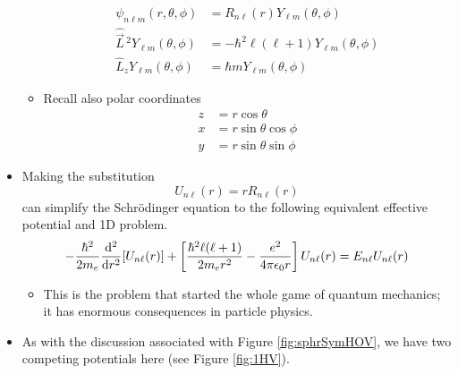 \documentclass[../notes.tex]{subfiles}
\begin{document}
\begin{itemize}
\begin{itemize}
        \begin{align*}
            \psi_{n\ell m}(r,\theta,\phi) &= R_{n\ell}(r)Y_{\ell m}(\theta,\phi)\\
            \hat{\vec{L}}{\,}^2Y_{\ell m}(\theta,\phi) &= -\hbar^2\ell(\ell+1)Y_{\ell m}(\theta,\phi)\\
            \hat{L}_zY_{\ell m}(\theta,\phi) &= \hbar mY_{\ell m}(\theta,\phi)
        \end{align*}
        \item Recall also polar coordinates
        \begin{align*}
            z &= r\cos\theta\\
            x &= r\sin\theta\cos\phi\\
            y &= r\sin\theta\sin\phi
        \end{align*}
    \end{itemize}
    \item Making the substitution
    \begin{equation*}
        U_{n\ell}(r) = rR_{n\ell}(r)
    \end{equation*}
    can simplify the Schr\"{o}dinger equation to the following equivalent effective potential and 1D problem.
    \begin{equation*}
        -\frac{\hbar^2}{2m_e}\dv[2]{r}[U_{n\ell}(r)]+\left[ \frac{\hbar^2\ell(\ell+1)}{2m_er^2}-\frac{e^2}{4\pi\epsilon_0r} \right]U_{n\ell}(r) = E_{n\ell}U_{n\ell}(r)
    \end{equation*}
    \begin{itemize}
        \item This is the problem that started the whole game of quantum mechanics; it has enormous consequences in particle physics.
    \end{itemize}
    \item As with the discussion associated with Figure \ref{fig:sphrSymHOV}, we have two competing potentials here (see Figure \ref{fig:1HV}).
    \begin{figure}[h!]
        \centering
\end{figure}
\end{itemize}
\end{document}
